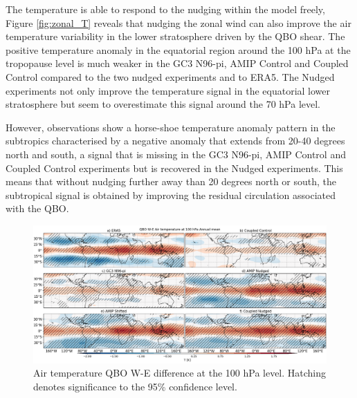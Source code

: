 
The temperature is able to respond to the nudging within the model freely, Figure \ref{fig:zonal_T} reveals that nudging the zonal wind can also improve the air temperature variability in the lower stratosphere driven by the QBO shear. The positive temperature anomaly in the equatorial region around the 100 hPa at the tropopause level is much weaker in the GC3 N96-pi, AMIP Control and Coupled Control compared to the two nudged experiments and to ERA5. The Nudged experiments not only improve the temperature signal in the equatorial lower stratosphere but seem to overestimate this signal around the 70 hPa level. 

However, observations show a horse-shoe temperature anomaly pattern in the subtropics characterised by a negative anomaly that extends from 20-40 degrees north and south, a signal that is missing in the GC3 N96-pi, AMIP Control and Coupled Control experiments but is recovered in the Nudged experiments. This means that without nudging further away than 20 degrees north or south, the subtropical signal is obtained by improving the residual circulation associated with the QBO. 


\begin{figure}[t!]
\centering
 \includegraphics[width=\linewidth]{figures/ta100climqbowf.png}
\caption[Zonal temperature QBO W-E difference 100 hPa level]{Air temperature QBO W-E difference at the 100 hPa level. Hatching denotes significance to the 95\% confidence level. }
\label{fig:ta100qbo}
\end{figure}

